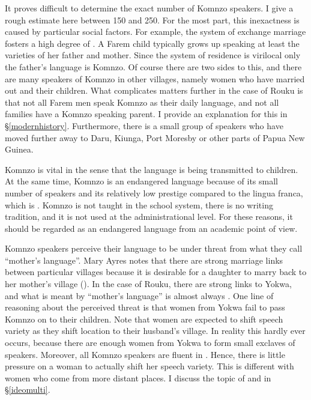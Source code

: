 It proves difficult to determine the exact number of Komnzo speakers. I give a rough estimate here between 150 and 250. For the most part, this inexactness is caused by particular social factors. For example, the system of exchange marriage fosters a high degree of . A Farem child typically grows up speaking at least the varieties of her father and mother. Since the system of residence is virilocal only the father's language is Komnzo. Of course there are two sides to this, and there are many speakers of Komnzo in other villages, namely women who have married out and their children. What complicates matters further in the case of Rouku is that not all Farem men speak Komnzo as their daily language, and not all families have a Komnzo speaking parent. I provide an explanation for this in \S{}\ref{modernhistory}. Furthermore, there is a small group of speakers who have moved further away to Daru, Kiunga, Port Moresby or other parts of Papua New Guinea.%

Komnzo is vital in the sense that the language is being transmitted to children. At the same time, Komnzo is an endangered language because of its small number of speakers and its relatively low prestige compared to the lingua franca, which is . Komnzo is not taught in the school system, there is no writing tradition, and it is not used at the administrational level. For these reasons, it should be regarded as an endangered language from an academic point of view.%

Komnzo speakers perceive their language to be under threat from what they call ``mother's language''. Mary Ayres notes that there are strong marriage links between particular villages because it is desirable for a daughter to marry back to her mother's village (\citeyear[226]{Ayres:ws}). In the case of Rouku, there are strong links to Yokwa, and what is meant by ``mother's language'' is almost always . One line of reasoning about the perceived threat is that women from Yokwa fail to pass Komnzo on to their children. Note that women are expected to shift speech variety as they shift location to their husband's village. In reality this hardly ever occurs, because there are enough women from Yokwa to form small exclaves of  speakers. Moreover, all Komnzo speakers are fluent in . Hence, there is little pressure on a woman to actually shift her speech variety. This is different with women who come from more distant places. I discuss the topic of  and  in \S{}\ref{ideomulti}.

